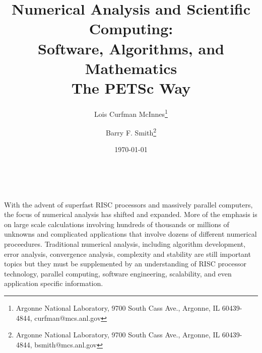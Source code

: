 %
%
\setlength{\textwidth}{6.5in}
\setlength{\oddsidemargin}{0.0in}
\setlength{\evensidemargin}{0.0in}
\setlength{\textheight}{9.2in}
\setlength{\topmargin}{-.8in}

\newcommand{\sindex}[1]{\index{#1}}
\newcommand{\F}{\mbox{\boldmath \(F\)}}
\newcommand{\x}{\mbox{\boldmath \(x\)}}
\newcommand{\rr}{\mbox{\boldmath \(r\)}}

\makeindex
 




\title{{\LARGE Numerical Analysis and Scientific Computing:} \\
       {\Large Software, Algorithms, and Mathematics}\\
       {The PETSc Way}\\
      }

\author{
       \and
         Lois Curfman McInnes\thanks{Argonne National Laboratory,
         9700 South Cass Ave., Argonne, IL 60439-4844,
         curfman@mcs.anl.gov
         }
       \and
         Barry F. Smith\thanks{Argonne National Laboratory,
         9700 South Cass Ave., Argonne, IL 60439-4844,
         bsmith@mcs.anl.gov
         }
       }


\maketitle

\date{\today}

\newpage

\hbox{ }

\vspace{2in}

With the advent of superfast RISC processors and massively parallel
computers, the focus of numerical analysis has shifted and
expanded. More of the emphasis is on large scale calculations
involving hundreds of thousands or millions of unknowns and
complicated applications that involve dozens of different numerical
proceedures. Traditional numerical analysis, including algorithm
development, error analysis, convergence analysis, complexity and
stability are still important topics but they must be supplemented by
an understanding of RISC processor technology, parallel computing,
software engineering, scalability, and even application specific 
information. 

